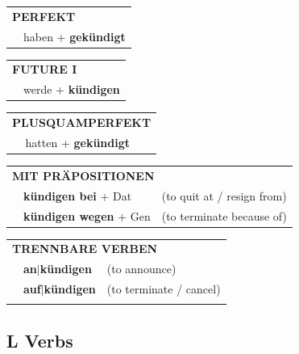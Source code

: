 \documentclass[10pt,a4paper]{revtex4-2}
\begin{document}
\begin{verbbox}
 \begin{tabular}{rl}
     \multicolumn{2}{l}{\textbf{PERFEKT}}\\
   & haben + \textbf{gekündigt}\\
  \end{tabular}
\hfill
   \begin{tabular}{rl}
    \multicolumn{2}{l}{\textbf{FUTURE I} }\\
   & werde + \textbf{kündigen}\\
  \end{tabular}
\hfill
   \begin{tabular}{rl}
      \multicolumn{2}{l}{\textbf{PLUSQUAMPERFEKT}}\\
   & hatten + \textbf{gekündigt}\\
  \end{tabular}

   \vspace{10pt}

   \begin{tabular}{lll}
      \multicolumn{3}{l}{\textbf{MIT PRÄPOSITIONEN}}\\
& \textbf{kündigen bei} + Dat & (to quit at / resign from)\\
& \textbf{kündigen wegen} + Gen & (to terminate because of)\\
\end{tabular}
  \hfill
   \begin{tabular}{lll}
      \multicolumn{3}{l}{\textbf{TRENNBARE VERBEN}}\\
 & \textbf{an$|$kündigen} & (to announce)\\
 & \textbf{auf$|$kündigen} & (to terminate / cancel)\\
\vspace{10pt}
  \end{tabular}

  \vspace{-5pt}

\end{verbbox}

\subsection{L Verbs}
\end{document}
